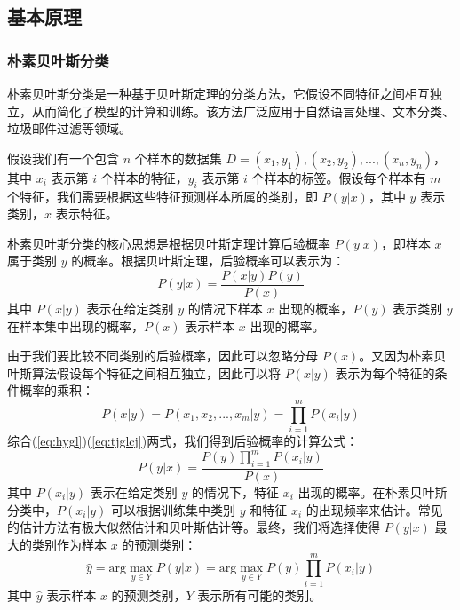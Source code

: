 \documentclass[a4paper,12pt,onecolumn,oneside]{article}
\begin{document}
\subsection{基本原理}
\subsubsection{朴素贝叶斯分类}
	朴素贝叶斯分类是一种基于贝叶斯定理的分类方法，它假设不同特征之间相互独立，从而简化了模型的计算和训练。该方法广泛应用于自然语言处理、文本分类、垃圾邮件过滤等领域。\par 
	假设我们有一个包含 $n$ 个样本的数据集 $D = {(x_1, y_1), (x_2, y_2), ..., (x_n, y_n)}$，其中 $x_i$ 表示第 $i$ 个样本的特征，$y_i$ 表示第 $i$ 个样本的标签。假设每个样本有 $m$ 个特征，我们需要根据这些特征预测样本所属的类别，即 $P(y|x)$，其中 $y$ 表示类别，$x$ 表示特征。\par 

	朴素贝叶斯分类的核心思想是根据贝叶斯定理计算后验概率 $P(y|x)$，即样本 $x$ 属于类别 $y$ 的概率。根据贝叶斯定理，后验概率可以表示为：
	\begin{equation}\label{eq:hygl}
	P(y|x) = \frac{P(x|y)P(y)}{P(x)}
	\end{equation}
	其中 $P(x|y)$ 表示在给定类别 $y$ 的情况下样本 $x$ 出现的概率，$P(y)$ 表示类别 $y$ 在样本集中出现的概率，$P(x)$ 表示样本 $x$ 出现的概率。\par

	由于我们要比较不同类别的后验概率，因此可以忽略分母 $P(x)$。又因为朴素贝叶斯算法假设每个特征之间相互独立，因此可以将 $P(x|y)$ 表示为每个特征的条件概率的乘积：
	\begin{equation}\label{eq:tjglcj}
	P(x|y) = P(x_1, x_2, ..., x_m | y) = \prod_{i=1}^{m}P(x_i|y)
	\end{equation}
	综合(\ref{eq:hygl})(\ref{eq:tjglcj})两式，我们得到后验概率的计算公式：
	\begin{equation*}
		P(y|x) = \frac{P(y)\prod_{i=1}^{m}P(x_i|y)}{P(x)}
	\end{equation*}
	其中 $P(x_i | y)$ 表示在给定类别 $y$ 的情况下，特征 $x_i$ 出现的概率。在朴素贝叶斯分类中，$P(x_i | y)$ 可以根据训练集中类别 $y$ 和特征 $x_i$ 的出现频率来估计。常见的估计方法有极大似然估计和贝叶斯估计等。最终，我们将选择使得 $P(y|x)$ 最大的类别作为样本 $x$ 的预测类别：
	\begin{equation}\label{eq:bayes}
		\hat{y} = \text{arg}\max_{y\in Y}P(y|x)=\text{arg}\max_{y\in Y}P(y)\prod_{i=1}^{m}P(x_i|y)
	\end{equation}
	其中 $\hat{y}$ 表示样本 $x$ 的预测类别，$Y$ 表示所有可能的类别。
\end{document}
